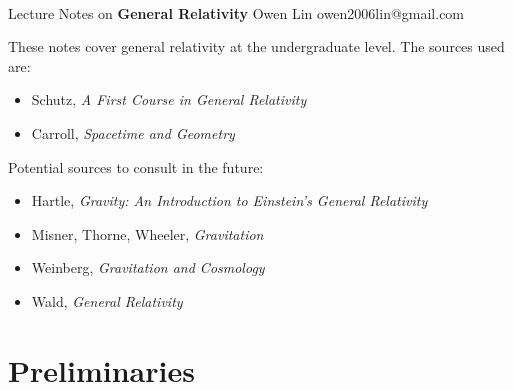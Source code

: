\documentclass[11pt]{article}
\begin{document}
\thispagestyle{empty}
\bigskip \
\vspace{0.1cm}

\begin{center}
{\fontsize{22}{22} \selectfont Lecture Notes on}
\vskip 16pt
{\fontsize{36}{36} \selectfont \bf \sffamily General Relativity}
\vskip 24pt
{\fontsize{18}{18} \selectfont \rmfamily Owen Lin} 
\vskip 6pt
{\fontsize{14}{14} \selectfont \ttfamily owen2006lin@gmail.com} 
\vskip 24pt
\end{center}

{\parindent0pt \baselineskip=15.5pt
These notes cover general relativity at the undergraduate level. The sources used are:
\begin{itemize}
    \item Schutz, \textit{A First Course in General Relativity}
    \item Carroll, \textit{Spacetime and Geometry}
\end{itemize}


Potential sources to consult in the future:

\begin{itemize}
    \item Hartle, \textit{Gravity: An Introduction to Einstein's General Relativity}
    \item Misner, Thorne, Wheeler, \textit{Gravitation}
    \item Weinberg, \textit{Gravitation and Cosmology}
    \item Wald, \textit{General Relativity}
\end{itemize}

}
 


\newpage
\microtoc
\newpage

\section{Preliminaries}
\end{document}

